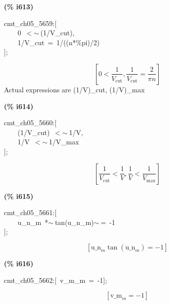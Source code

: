 \documentclass[fleqn]{article}
\begin{document}
\noindent
\begin{minipage}[t]{4.000000em}\color{red}\bfseries
(\% i613)	
\end{minipage}
\begin{minipage}[t]{\textwidth}\color{blue}
cmt\_ch05\_5659:[\\
\ \ \ \ 0\ \ensuremath{<}\ensuremath{\sim\ }(1/V\_cut),\\
\ \ \ \ 1/V\_cut\ =\ 1/((n*\%pi)/2)\\
];
\end{minipage}
\[\displaystyle \tag{\% o613} 
\left[ 0\operatorname{<  }\frac{1}{{V_{\ensuremath{\mathrm{cut}}}}}\operatorname{,}\frac{1}{{V_{\ensuremath{\mathrm{cut}}}}}=\frac{2}{\ensuremath{\pi}  n}\right] \mbox{}
\]
Actual expressions are (1/V)\_cut, (1/V)\_max


\noindent
\begin{minipage}[t]{4.000000em}\color{red}\bfseries
(\% i614)	
\end{minipage}
\begin{minipage}[t]{\textwidth}\color{blue}
cmt\_ch05\_5660:[\\
\ \ \ \ (1/V\_cut)\ \ensuremath{<}\ensuremath{\sim\ }1/V,\ \\
\ \ \ \ 1/V\ \ensuremath{<}\ensuremath{\sim\ }1/V\_max\\
];
\end{minipage}
\[\displaystyle \tag{\% o614} 
\left[ \frac{1}{{V_{\ensuremath{\mathrm{cut}}}}}\operatorname{<  }\frac{1}{V}\operatorname{,}\frac{1}{V}\operatorname{<  }\frac{1}{{V_{\ensuremath{\mathrm{max}}}}}\right] \mbox{}
\]


\noindent
\begin{minipage}[t]{4.000000em}\color{red}\bfseries
(\% i615)	
\end{minipage}
\begin{minipage}[t]{\textwidth}\color{blue}
cmt\_ch05\_5661:[\\
\ \ \ \ u\_n\_m\ *\ensuremath{\sim\ }tan(u\_n\_m)\ensuremath{\sim\ }=\ -1\\
];
\end{minipage}
\[\displaystyle \tag{\% o615} 
\left[ {{\ensuremath{\mathrm{u\_ n}}}_m} \tan{\left( {{\ensuremath{\mathrm{u\_ n}}}_m}\right) }=-1\right] \mbox{}
\]


\noindent
\begin{minipage}[t]{4.000000em}\color{red}\bfseries
(\% i616)	
\end{minipage}
\begin{minipage}[t]{\textwidth}\color{blue}
cmt\_ch05\_5662:[\ v\_m\_m\ =\ -1];
\end{minipage}
\[\displaystyle \tag{\% o616} 
\left[ {{\ensuremath{\mathrm{v\_ m}}}_m}=-1\right] \mbox{}
\]
\end{document}
